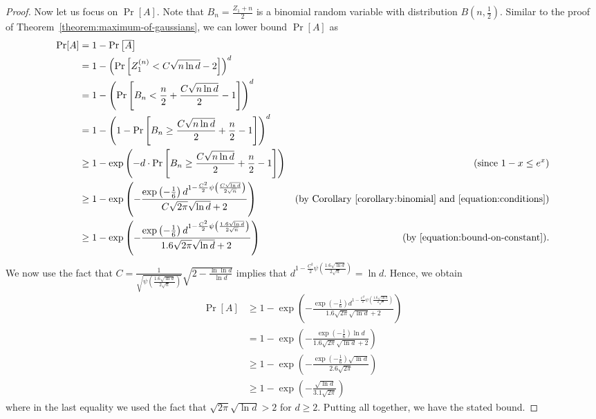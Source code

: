 \documentclass{article}
\begin{document}
\begin{proof}
Now let us focus on $\Pr[A]$. Note that $B_n = \frac{Z_1 + n}{2}$ is a binomial random variable with distribution $B(n,\frac{1}{2})$.
Similar to the proof of Theorem~\ref{theorem:maximum-of-gaussians}, we can lower bound $\Pr[A]$ as
\begin{align*}
\Pr[A]
& = 1 - \Pr \left[ \overline{A} \right] \\
& = 1 - \left(\Pr \left[ Z^{(n)}_1 < C \sqrt{n \ln d} - 2 \right] \right)^d \\
& = 1 - \left(\Pr \left[ B_n < \frac{n}{2} + \frac{C \sqrt{n \ln d}}{2} - 1 \right] \right)^d \\
& = 1 - \left(1 - \Pr\left[B_n \ge \frac{C \sqrt{n \ln d}}{2} +\frac{n}{2} - 1 \right] \right)^d \\
& \ge 1 - \exp\left(-d \cdot \Pr \left[ B_n \ge \frac{C \sqrt{n \ln d}}{2} +\frac{n}{2} - 1 \right] \right) & \text{(since $1 - x \le e^x$)} \\
& \ge 1 - \exp\left(-\frac{\exp\left(-\frac{1}{6}\right) d^{1-\frac{C^2}{2} \psi\left(\frac{C \sqrt{\ln d}}{2 \sqrt{n}}\right)}}{C \sqrt{2\pi} \sqrt{\ln d}+2}\right) & \text{(by Corollary \ref{corollary:binomial} and \eqref{equation:conditions})} \\
& \ge 1 - \exp\left(-\frac{\exp\left(-\frac{1}{6}\right) d^{1-\frac{C^2}{2} \psi\left(\frac{1.6 \sqrt{\ln d}}{2 \sqrt{n}}\right)}}{1.6 \sqrt{2\pi} \sqrt{\ln d}+2}\right) & \text{(by \eqref{equation:bound-on-constant}).}
\end{align*}
We now use the fact that $C=\frac{1}{\sqrt{\psi\left(\frac{1.6 \sqrt{\ln d}}{2 \sqrt{n}}\right)}}\sqrt{2- \frac{\ln \ln d}{\ln d}}$ implies that $d^{1-\frac{C^2}{2} \psi\left(\frac{1.6 \sqrt{\ln d}}{2 \sqrt{n}}\right)}=\ln d$. Hence, we obtain
\begin{align*}
\Pr[A]
& \ge 1 - \exp\left(-\frac{\exp\left(-\frac{1}{6}\right) d^{1-\frac{C^2}{2} \psi\left(\frac{1.6 \sqrt{\ln d}}{2 \sqrt{n}}\right)}}{1.6 \sqrt{2\pi} \sqrt{\ln d}+2}\right) \\
& = 1 - \exp\left(-\frac{\exp\left(-\frac{1}{6}\right) \ln d}{1.6 \sqrt{2\pi} \sqrt{\ln d}+2}\right) \\
& \ge 1 - \exp\left(-\frac{\exp\left(-\frac{1}{6}\right) \sqrt{\ln d}}{2.6 \sqrt{2\pi}}\right)\\
& \ge 1 - \exp\left(-\frac{\sqrt{\ln d}}{3.1 \sqrt{2\pi}}\right)
\end{align*}
where in the last equality we used the fact that $\sqrt{2\pi} \sqrt{\ln d} > 2$ for $d\ge 2$. Putting all together, we have the stated bound.
\end{proof}
\end{document}
